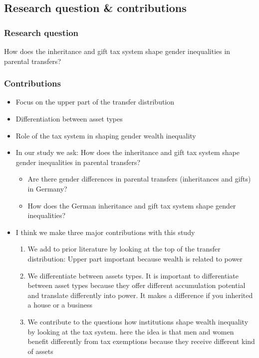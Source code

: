\documentclass[
  letterpaper,
  DIV=11,
  numbers=noendperiod]{scrartcl}
\providecommand{\tightlist}{%
  \setlength{\itemsep}{0pt}\setlength{\parskip}{0pt}}\usepackage{longtable,booktabs,array}
\begin{document}
\hypertarget{research-question-contributions}{%
\subsection{Research question \&
contributions}\label{research-question-contributions}}

\hypertarget{research-question}{%
\subsubsection{Research question}\label{research-question}}

How does the inheritance and gift tax system shape gender inequalities
in parental transfers?

\hypertarget{contributions}{%
\subsubsection{Contributions}\label{contributions}}

\begin{itemize}
\item
  Focus on the upper part of the transfer distribution
\item
  Diﬀerentiation between asset types
\item
  Role of the tax system in shaping gender wealth inequality
\end{itemize}

\begin{itemize}
\tightlist
\item
  In our study we ask: How does the inheritance and gift tax system
  shape gender inequalities in parental transfers?

  \begin{itemize}
  \item
    Are there gender diﬀerences in parental transfers (inheritances and
    gifts) in Germany?
  \item
    How does the German inheritance and gift tax system shape gender
    inequalities?
  \end{itemize}
\item
  I think we make three major contributions with this study

  \begin{enumerate}
  \def\labelenumi{\arabic{enumi}.}
  \tightlist
  \item
    We add to prior literature by looking at the top of the transfer
    distribution: Upper part important because wealth is related to
    power
  \item
    We differentiate between assets types. It is important to
    differentiate between asset types because they offer different
    accumulation potential and translate differently into power. It
    makes a difference if you inherited a house or a business
  \item
    We contribute to the questions how institutions shape wealth
    inequality by looking at the tax system. here the idea is that men
    and women benefit differently from tax exemptions because they
    receive different kind of assets
  \end{enumerate}
\end{itemize}
\end{document}
